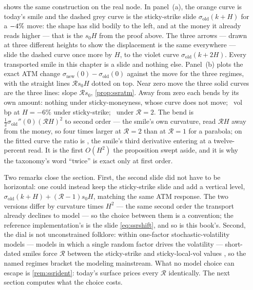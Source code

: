  shows the same construction on the real node.  In
panel~(a), the orange curve is today's smile and the dashed grey curve
is the sticky-strike slide $\sigma_{\mathrm{old}}(k+H)$ for a
$-4\%$ move: the shape has slid bodily to the left,
and at the money it already reads higher --- that is the $s_0H$ from
the proof above.  The three arrows --- drawn at three different
heights to show the displacement is the same everywhere --- slide the
dashed curve once more by $H$, to the violet curve
$\sigma_{\mathrm{old}}(k+2H)$.  Every transported smile in this
chapter is a slide and nothing else.
Panel~(b) plots the exact ATM change $\sigma_{\mathrm{new}}(0)-
\sigma_{\mathrm{old}}(0)$ against the move for the three regimes, with
the straight lines $\mathcal{R}s_0H$ dotted on top.  Near zero move
the three solid curves are the three lines: slope $\mathcal{R}s_0$,
\cref{prop:ssratm}.  Away from zero each bends by its own amount:
nothing under sticky-moneyness, whose curve does not move;
\MacSsrDialBendBp\ vol bp at $H=-6\%$ under sticky-strike;
\MacSsrDialBendTwoBp\ under $\mathcal{R}=2$.  The bend is
$\tfrac12\sigma_{\mathrm{old}}''(0)(\mathcal{R}H)^{2}$ to second
order --- the smile's own curvature, read $\mathcal{R}H$ away from
the money, so four times larger at $\mathcal{R}=2$ than at
$\mathcal{R}=1$ for a parabola; on the fitted curve the ratio is
\MacSsrDialBendRatio, the smile's third derivative entering at a
twelve-percent read.  It is the first $O(H^2)$ the proposition swept
aside, and it is why the taxonomy's word ``twice'' is exact only at
first order.

Two remarks close the section.  First, the second slide did not have
to be horizontal: one could instead keep the sticky-strike slide and
add a vertical level, $\sigma_{\mathrm{old}}(k+H)+(\mathcal{R}-1)s_0H$,
matching the same ATM response.  The two versions differ by
curvature times $H^{2}$ --- the same second order the transport
already declines to model --- so the choice between them is a
convention; the reference implementation's is the slide
\eqref{eq:ssrshift}, and so is this book's.  Second, the dial is not unconstrained folklore:
within one-factor stochastic-volatility models --- models in which a
single random factor drives the volatility --- short-dated smiles
force $\mathcal{R}$ between the sticky-strike and sticky-local-vol
values \citep{Bergomi2016}, so the named regimes bracket the
modeling mainstream.  What no model choice can escape is
\cref{rem:ssrident}: today's surface prices every $\mathcal{R}$
identically.  The next section computes what the choice costs.
